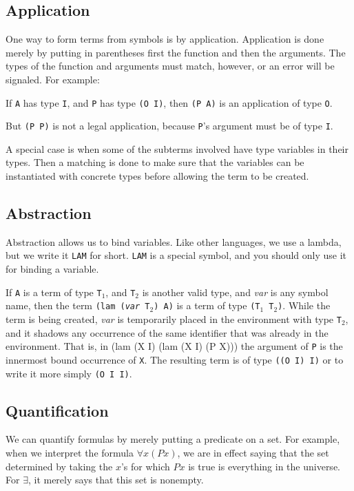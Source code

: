\subsection{Application}

One way to form terms from symbols is by application.  Application is
done merely by putting in parentheses first the function and then the
arguments.  The types of the function and arguments must match, however,
or an error will be signaled.  For example:

If {\tt A} has type {\tt I}, and {\tt P} has type {\tt (O I)},
 then {\tt (P A)} is an application
of type {\tt O}. 

But {\tt (P P)} is not a legal application, because {\tt P}'s argument must be of
type {\tt I}.


A special case is when some of the subterms involved have type variables
in their types.  Then a matching is done to make sure that the variables
can be instantiated with concrete types before allowing the term to be
created.

\subsection{Abstraction}

Abstraction allows us to bind variables.  Like other languages, we use
a lambda, but we write it {\tt LAM} for short.  {\tt LAM} is a special
symbol, and you should only use it for binding a variable.

If {\tt A} is a term of type {\tt T$_1$}, and {\tt T$_2$} is
another valid type, and {\it var} is any symbol name, 
then the term {\tt (lam ({\it var} T$_2$) A)} is
a term of type {\tt (T$_1$ T$_2$)}.   While the term is being created,
{\it var} is temporarily placed in the environment with type {\tt T$_2$},
and it shadows any occurrence of the same identifier that was already
in the environment.  That is, in {\vb (lam (X I) (lam (X I) (P X)))}
the argument of {\tt P} is the innermost bound occurrence of {\tt X}.
The resulting term is of type {\tt ((O I) I)} or to write it more simply
{\tt (O I I)}.

\subsection{Quantification}

We can quantify formulas by merely putting a predicate on a set.  For example,
when we interpret the formula $\forall x (P x)$, we are in effect saying 
that the set determined by taking the $x$'s for which $P x$ is true is
everything in the universe.  For $\exists$, it merely says that this set is nonempty.

